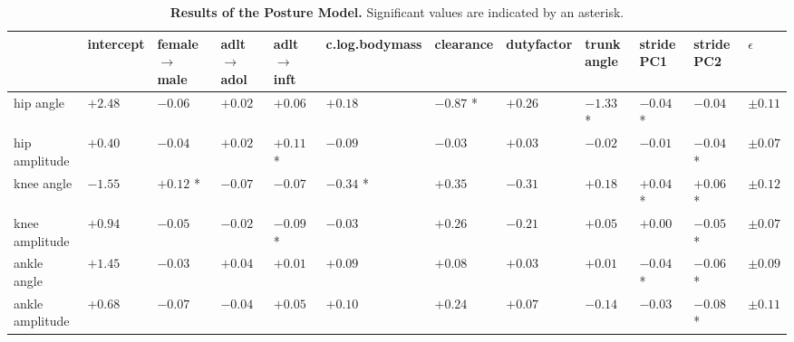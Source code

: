 \begin{landscape}\clearpage
\begin{table}[t!]
\caption{\label{tab:postureresults}\textbf{Results of the Posture Model.} Significant values are indicated by an asterisk.}
\centering
\scriptsize
\begin{tabular}{llllllllllll}
 & intercept & female \(\rightarrow\) male & adlt \(\rightarrow\) adol & adlt \(\rightarrow\) inft & c.log.bodymass & clearance & dutyfactor & trunk angle & stride PC1 & stride PC2 & \(\epsilon\)\\[0pt]
\hline
hip angle & \(+2.48\) & \(-0.06\) & \(+0.02\) & \(+0.06\) & \(+0.18\) & \(-0.87\) * & \(+0.26\) & \(-1.33\) * & \(-0.04\) * & \(-0.04\) & \(\pm 0.11\)\\[0pt]
hip amplitude & \(+0.40\) & \(-0.04\) & \(+0.02\) & \(+0.11\) * & \(-0.09\) & \(-0.03\) & \(+0.03\) & \(-0.02\) & \(-0.01\) & \(-0.04\) * & \(\pm 0.07\)\\[0pt]
knee angle & \(-1.55\) & \(+0.12\) * & \(-0.07\) & \(-0.07\) & \(-0.34\) * & \(+0.35\) & \(-0.31\) & \(+0.18\) & \(+0.04\) * & \(+0.06\) * & \(\pm 0.12\)\\[0pt]
knee amplitude & \(+0.94\) & \(-0.05\) & \(-0.02\) & \(-0.09\) * & \(-0.03\) & \(+0.26\) & \(-0.21\) & \(+0.05\) & \(+0.00\) & \(-0.05\) * & \(\pm 0.07\)\\[0pt]
ankle angle & \(+1.45\) & \(-0.03\) & \(+0.04\) & \(+0.01\) & \(+0.09\) & \(+0.08\) & \(+0.03\) & \(+0.01\) & \(-0.04\) * & \(-0.06\) * & \(\pm 0.09\)\\[0pt]
ankle amplitude & \(+0.68\) & \(-0.07\) & \(-0.04\) & \(+0.05\) & \(+0.10\) & \(+0.24\) & \(+0.07\) & \(-0.14\) & \(-0.03\) & \(-0.08\) * & \(\pm 0.11\)\\[0pt]
\end{tabular}
\end{table}


\end{landscape}
